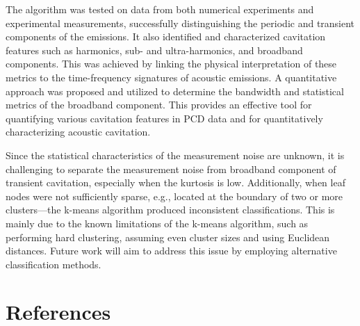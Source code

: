 \documentclass[preprint, linenumbers]{revtex4-2}
\newcommand{\km}{k-means }
\begin{document}
The algorithm was tested on data from both numerical experiments and experimental measurements, successfully distinguishing the periodic and transient components of the emissions. It also identified and characterized cavitation features such as harmonics, sub- and ultra-harmonics, and broadband components. This was achieved by linking the physical interpretation of these metrics to the time-frequency signatures of acoustic emissions. A quantitative approach was proposed and utilized to determine the bandwidth and statistical metrics of the broadband component. This provides an effective tool for quantifying various cavitation features in PCD data and for quantitatively characterizing acoustic cavitation. 

Since the statistical characteristics of the measurement noise are unknown, it is challenging to separate the measurement noise from broadband component of transient cavitation, especially when the kurtosis is low. Additionally, when leaf nodes were not sufficiently sparse, e.g., located at the boundary of two or more clusters—the \km algorithm produced inconsistent classifications. This is mainly due to the known limitations of the \km algorithm, such as performing hard clustering, assuming even cluster sizes and using Euclidean distances. Future work will aim to address this issue by employing alternative classification methods.
	

			
			
			
\section{References}

			
			
			
\end{document}
